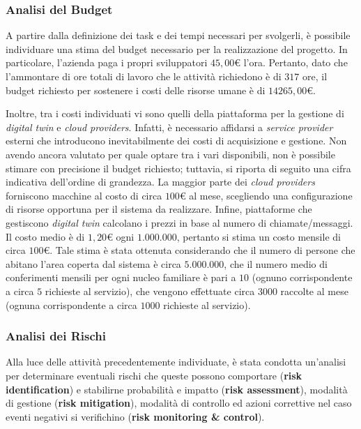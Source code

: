 \subsubsection{Analisi del Budget}
A partire dalla definizione dei task e dei tempi necessari per svolgerli, è possibile individuare una stima del budget necessario per la realizzazione del progetto.
In particolare, l'azienda paga i propri sviluppatori $45,00$\euro{} l'ora.
Pertanto, dato che l'ammontare di ore totali di lavoro che le attività richiedono è di $317$ ore, il budget richiesto per sostenere i costi delle risorse umane è di $14265,00$\euro{}.

Inoltre, tra i costi individuati vi sono quelli della piattaforma per la gestione di \textit{digital twin} e \textit{cloud providers}.
Infatti, è necessario affidarsi a \textit{service provider} esterni che introducono inevitabilmente dei costi di acquisizione e gestione.
Non avendo ancora valutato per quale optare tra i vari disponibili, non è possibile stimare con precisione il budget richiesto; tuttavia, si riporta di seguito una cifra indicativa dell'ordine di grandezza.
La maggior parte dei \textit{cloud providers} forniscono macchine al costo di circa $100$\euro{} al mese, scegliendo una configurazione di risorse opportuna per il sistema da realizzare.
Infine, piattaforme che gestiscono \textit{digital twin} calcolano i prezzi in base al numero di chiamate/messaggi.
Il costo medio è di $1,20$\euro{} ogni $1.000.000$, pertanto si stima un costo mensile di circa $100$\euro.
Tale stima è stata ottenuta considerando che il numero di persone che abitano l'area coperta dal sistema è circa $5.000.000$, che il numero medio di conferimenti mensili per ogni nucleo familiare è pari a $10$ (ognuno corrispondente a circa $5$ richieste al servizio), che vengono effettuate circa $3000$ raccolte al mese (ognuna corrispondente a circa $1000$ richieste al servizio).

\subsubsection{Analisi dei Rischi}\label{sec:analisi-dei-rischi}
Alla luce delle attività precedentemente individuate, è stata condotta un'analisi per determinare eventuali rischi che queste possono comportare (\textbf{risk identification}) e stabilirne probabilità e impatto (\textbf{risk assessment}), modalità di gestione (\textbf{risk mitigation}), modalità di controllo ed azioni correttive nel caso eventi negativi si verifichino (\textbf{risk monitoring \& control}).

